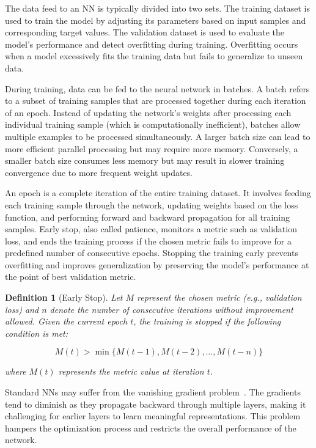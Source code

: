 \documentclass[ppgc,diss,english]{iiufrgs}
\newtheorem{definition}{Definition}
\begin{document}
The data feed to an NN is typically divided into two sets. The training dataset is used to train the model by adjusting its parameters based on input samples and corresponding target values. The validation dataset is used to evaluate the model's performance and detect overfitting during training. Overfitting occurs when a model excessively fits the training data but fails to generalize to unseen data.

During training, data can be fed to the neural network in batches. A batch refers to a subset of training samples that are processed together during each iteration of an epoch. Instead of updating the network's weights after processing each individual training sample (which is computationally inefficient), batches allow multiple examples to be processed simultaneously. A larger batch size can lead to more efficient parallel processing but may require more memory. Conversely, a smaller batch size consumes less memory but may result in slower training convergence due to more frequent weight updates.

An epoch is a complete iteration of the entire training dataset. It involves feeding each training sample through the network, updating weights based on the loss function, and performing forward and backward propagation for all training samples. Early stop, also called patience, monitors a metric such as validation loss, and ends the training process if the chosen metric fails to improve for a predefined number of consecutive epochs. Stopping the training early prevents overfitting and improves generalization by preserving the model's performance at the point of best validation metric.

\begin{definition}[Early Stop]
Let $M$ represent the chosen metric (e.g., validation loss) and $n$ denote the number of consecutive iterations without improvement allowed. Given the current epoch $t$, the training is stopped if the following condition is met:

$$M(t) > \min\{M(t-1), M(t-2), \ldots, M(t-n)\}$$

where $M(t)$ represents the metric value at iteration $t$.
\end{definition}


Standard NNs may suffer from the vanishing gradient problem~\cite{Hochreiter/1991}. The gradients tend to diminish as they propagate backward through multiple layers, making it challenging for earlier layers to learn meaningful representations. This problem hampers the optimization process and restricts the overall performance of the network.
\end{document}
